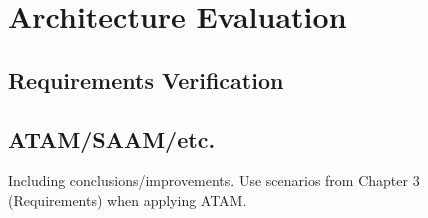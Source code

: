 \chapter{Architecture Evaluation}

\section{Requirements Verification}

\section{ATAM/SAAM/etc.}

Including conclusions/improvements. Use scenarios from Chapter 3 (Requirements) when applying ATAM.
